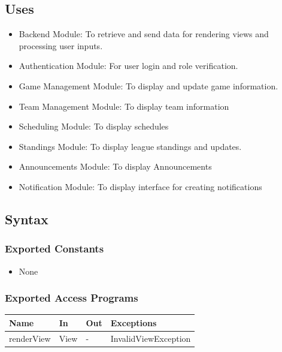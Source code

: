\documentclass[12pt, titlepage]{article}
\begin{document}
\subsection{Uses}

\begin{itemize}
    \item Backend Module: To retrieve and send data for rendering views and processing user inputs.
    \item Authentication Module: For user login and role verification.
    \item Game Management Module: To display and update game information.
    \item Team Management Module: To display team information
    \item Scheduling Module: To display schedules
    \item Standings Module: To display league standings and updates.
    \item Announcements Module: To display Announcements
    \item Notification Module: To display interface for creating notifications
\end{itemize}

\subsection{Syntax}

\subsubsection{Exported Constants}

\begin{itemize}
    \item None
\end{itemize}

\subsubsection{Exported Access Programs}

\begin{center}
  \begin{tabularx}{\textwidth}{|l|X|X|X|}
  \hline
  \textbf{Name} & \textbf{In} & \textbf{Out} & \textbf{Exceptions} \\
  \hline
  renderView & View & - & InvalidViewException \\
  \hline
  \end{tabularx}
\end{center}
\end{document}
